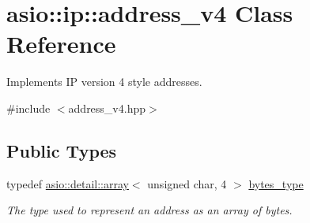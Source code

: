 \hypertarget{classasio_1_1ip_1_1address__v4}{}\section{asio\+:\+:ip\+:\+:address\+\_\+v4 Class Reference}
\label{classasio_1_1ip_1_1address__v4}


Implements I\+P version 4 style addresses.  




{\ttfamily \#include $<$address\+\_\+v4.\+hpp$>$}

\subsection*{Public Types}
\begin{DoxyCompactItemize}
\item 
typedef \hyperlink{classboost_1_1array}{asio\+::detail\+::array}$<$ unsigned char, 4 $>$ \hyperlink{classasio_1_1ip_1_1address__v4_a215b307474a39b561a7dd9be3e7a99ad}{bytes\+\_\+type}
\begin{DoxyCompactList}\small\item\em The type used to represent an address as an array of bytes. \end{DoxyCompactList}\end{DoxyCompactItemize}
